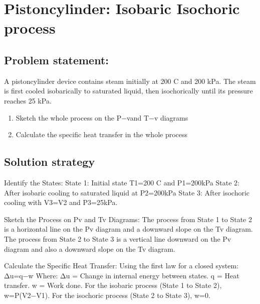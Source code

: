 \documentclass[letterpaper,10pt,english]{jupyterBook}
\begin{document}
\section{Piston\sphinxhyphen{}cylinder: Isobaric\sphinxhyphen{} Isochoric process}
\label{\detokenize{notebooks/Chapter2/piston-cylinder-isobaric-isochoric:piston-cylinder-isobaric-isochoric-process}}\label{\detokenize{notebooks/Chapter2/piston-cylinder-isobaric-isochoric::doc}}

\subsection{Problem statement:}
\label{\detokenize{notebooks/Chapter2/piston-cylinder-isobaric-isochoric:problem-statement}}
\sphinxAtStartPar
A piston\sphinxhyphen{}cylinder device contains steam initially at 200 C and 200 kPa. The steam is first cooled isobarically to saturated liquid, then isochorically until its pressure reaches 25 kPa.
\begin{enumerate}
%
\item {} 
\sphinxAtStartPar
Sketch the whole process on the P−vand T−v diagrams

\item {} 
\sphinxAtStartPar
Calculate the specific heat transfer in the whole process

\end{enumerate}


\subsection{Solution strategy}
\label{\detokenize{notebooks/Chapter2/piston-cylinder-isobaric-isochoric:solution-strategy}}
\sphinxAtStartPar
Identify the States:
State 1: Initial state \sphinxhyphen{} T1=200 C and P1=200kPa
State 2: After isobaric cooling to saturated liquid at P2=200kPa
State 3: After isochoric cooling with V3=V2 and P3=25kPa.

\sphinxAtStartPar
Sketch the Process on P\sphinxhyphen{}v and T\sphinxhyphen{}v Diagrams:
The process from State 1 to State 2 is a horizontal line on the P\sphinxhyphen{}v diagram and a downward slope on the T\sphinxhyphen{}v diagram.
The process from State 2 to State 3 is a vertical line downward on the P\sphinxhyphen{}v diagram and also a downward slope on the T\sphinxhyphen{}v diagram.

\sphinxAtStartPar
Calculate the Specific Heat Transfer:
Using the first law for a closed system:
Δu=q−w
Where:
Δu = Change in internal energy between states.
q = Heat transfer.
w = Work done.
For the isobaric process (State 1 to State 2), w=P(V2−V1).
For the isochoric process (State 2 to State 3), w=0.
\end{document}
